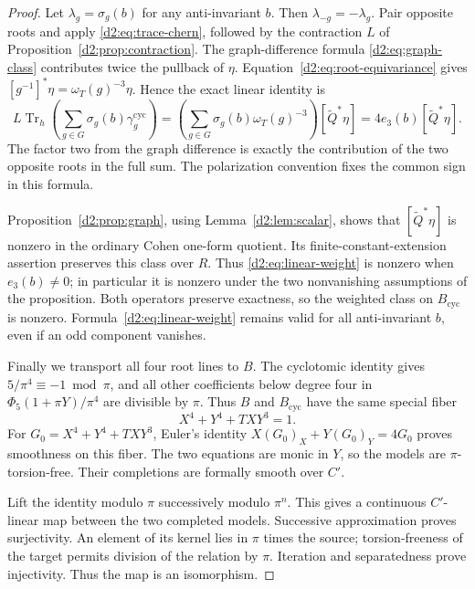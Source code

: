 \documentclass[11pt,a4paper]{amsart}
\numberwithin{equation}{section}
\theoremstyle{definition}
\theoremstyle{remark}
\newcommand{\Dtwowt}{\widetilde}
\newcommand{\Dtwocyc}{\mathrm{cyc}}
\DeclareMathOperator{\DtwoTr}{Tr}
\begin{document}
\begin{proof}
Let \(\lambda_g=\sigma_g(b)\) for any anti-invariant \(b\).
Then \(\lambda_{-g}=-\lambda_g\).
Pair opposite roots and apply \eqref{d2:eq:trace-chern}, followed by
the contraction \(L\) of Proposition~\ref{d2:prop:contraction}.
The graph-difference formula \eqref{d2:eq:graph-class} contributes
twice the pullback of \(\eta\).
Equation~\eqref{d2:eq:root-equivariance} gives
\([g^{-1}]^*\eta=\omega_T(g)^{-3}\eta\).
Hence the exact linear identity is
\begin{equation}\label{d2:eq:linear-weight}
 L\DtwoTr_h\left(\sum_{g\in G}\sigma_g(b)\gamma_g^\Dtwocyc\right)
   =
 \left(\sum_{g\in G}\sigma_g(b)\omega_T(g)^{-3}\right)
       [\Dtwowt Q^*\eta]
   =4e_3(b)[\Dtwowt Q^*\eta].
\end{equation}
The factor two from the graph difference is exactly the contribution
of the two opposite roots in the full sum.
The polarization convention fixes the common sign in this formula.

Proposition~\ref{d2:prop:graph}, using
Lemma~\ref{d2:lem:scalar}, shows that \([\Dtwowt Q^*\eta]\) is nonzero
in the ordinary Cohen one-form quotient.
Its finite-constant-extension assertion preserves this class over
\(R\).
Thus \eqref{d2:eq:linear-weight} is nonzero when \(e_3(b)\ne0\);
in particular it is nonzero under the two nonvanishing assumptions
of the proposition.
Both operators preserve exactness, so the weighted class on
\(B_{\Dtwocyc}\) is nonzero.
Formula~\eqref{d2:eq:linear-weight} remains valid for all anti-invariant \(b\), even if an odd component vanishes.

Finally we transport all four root lines to \(B\).
The cyclotomic identity gives \(5/\pi^4\equiv-1\bmod\pi\), and all
other coefficients below degree four in
\(\Phi_5(1+\pi Y)/\pi^4\) are divisible by \(\pi\).
Thus \(B\) and \(B_{\Dtwocyc}\) have the same special fiber
\[
 X^4+Y^4+TXY^3=1.
\]
For \(G_0=X^4+Y^4+TXY^3\), Euler's identity
\(X(G_0)_X+Y(G_0)_Y=4G_0\) proves smoothness on this fiber.
The two equations are monic in \(Y\), so the models are
\(\pi\)-torsion-free. Their completions are formally smooth over
\(C'\).

Lift the identity modulo \(\pi\) successively modulo \(\pi^n\).
This gives a continuous \(C'\)-linear map between the two completed
models.
Successive approximation proves surjectivity.
An element of its kernel lies in \(\pi\) times the source;
torsion-freeness of the target permits division of the relation by
\(\pi\). Iteration and separatedness prove injectivity.
Thus the map is an isomorphism.


\end{proof}
\end{document}
